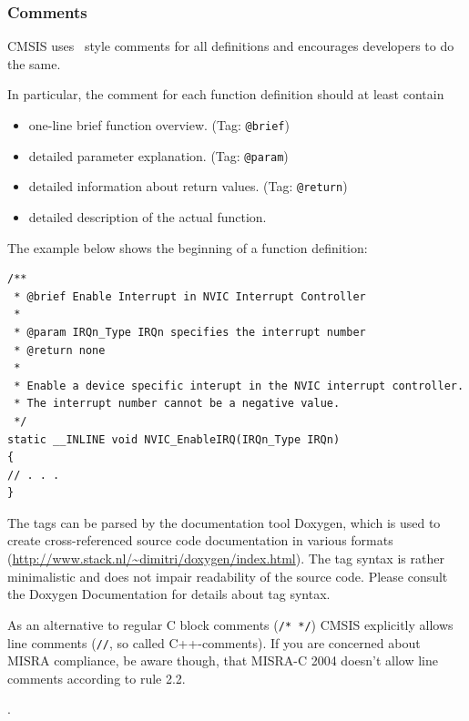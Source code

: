 \subsubsection{Comments}

CMSIS uses \ style comments for all definitions and encourages
developers to do the same.

In particular, the comment for each function definition should at least contain

\begin{itemize}
\item one-line brief function overview. (Tag: \verb|@brief|)
\item detailed parameter explanation. (Tag: \verb|@param|)
\item detailed information about return values. (Tag: \verb|@return|)
\item detailed description of the actual function.
\end{itemize}

The example below shows the beginning of a function definition:

\begin{lstlisting}[style=cpp]
/**
 * @brief Enable Interrupt in NVIC Interrupt Controller
 *
 * @param IRQn_Type IRQn specifies the interrupt number
 * @return none
 *
 * Enable a device specific interupt in the NVIC interrupt controller.
 * The interrupt number cannot be a negative value.
 */
static __INLINE void NVIC_EnableIRQ(IRQn_Type IRQn)
{
// . . .
}
\end{lstlisting}

The tags can be parsed by the documentation tool Doxygen, which is used to
create cross-referenced source code documentation in various formats
(\url{http://www.stack.nl/~dimitri/doxygen/index.html}). The tag syntax is
rather minimalistic and does not impair readability of the source code. Please
consult the Doxygen Documentation for details about tag syntax.

As an alternative to regular C block comments (\verb|/* */|) CMSIS explicitly
allows line comments (\verb|//|, so called C++-comments). If you are concerned
about MISRA compliance, be aware though, that MISRA-C 2004 doesn’t allow line
comments according to rule 2.2.

 .

